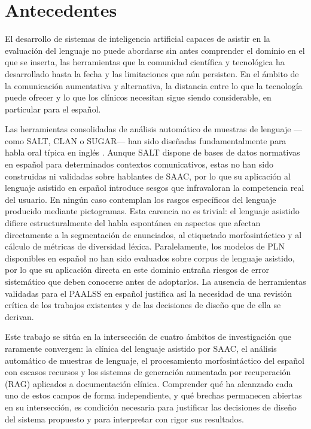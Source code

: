 \chapter{Antecedentes}
\label{chap:antecedentes}

El desarrollo de sistemas de inteligencia artificial capaces de asistir en la evaluación
del lenguaje no puede abordarse sin antes comprender el dominio en el que se inserta,
las herramientas que la comunidad científica y tecnológica ha desarrollado hasta la fecha y las
limitaciones que aún persisten. En el ámbito de la comunicación aumentativa y
alternativa, la distancia entre lo que la tecnología puede ofrecer y lo que los
clínicos necesitan sigue siendo considerable, en particular para el español.

Las herramientas consolidadas de análisis automático de muestras de lenguaje —como
\ac{SALT}, \ac{CLAN} o \ac{SUGAR}— han sido diseñadas fundamentalmente para habla oral
típica en inglés \cite{lsa_computer_programs}. Aunque \ac{SALT} dispone de bases de
datos normativas en español para determinados contextos comunicativos, estas no han sido
construidas ni validadas sobre hablantes de \ac{SAAC}, por lo que su aplicación al
lenguaje asistido en español introduce sesgos que infravaloran la competencia real del
usuario. En ningún caso contemplan los rasgos específicos del lenguaje producido
mediante pictogramas. Esta carencia no es trivial:
el lenguaje asistido difiere estructuralmente del habla espontánea en aspectos que afectan
directamente a la segmentación de enunciados, al etiquetado morfosintáctico y al cálculo
de métricas de diversidad léxica. Paralelamente, los modelos de \ac{PLN} disponibles en
español no han sido evaluados sobre corpus de lenguaje asistido, por lo que su aplicación
directa en este dominio entraña riesgos de error sistemático que deben conocerse antes de
adoptarlos. La ausencia de herramientas validadas para el \ac{PAALSS} en español justifica
así la necesidad de una revisión crítica de los trabajos existentes y de las decisiones
de diseño que de ella se derivan.

Este trabajo se sitúa en la intersección de cuatro ámbitos de investigación que raramente
convergen: la clínica del lenguaje asistido por \ac{SAAC}, el análisis automático de
muestras de lenguaje, el procesamiento morfosintáctico del español con escasos recursos y
los sistemas de generación aumentada por recuperación (\ac{RAG}) aplicados a documentación
clínica. Comprender qué ha alcanzado cada uno de estos campos de forma independiente, y
qué brechas permanecen abiertas en su intersección, es condición necesaria para justificar
las decisiones de diseño del sistema propuesto y para interpretar con rigor sus resultados.

